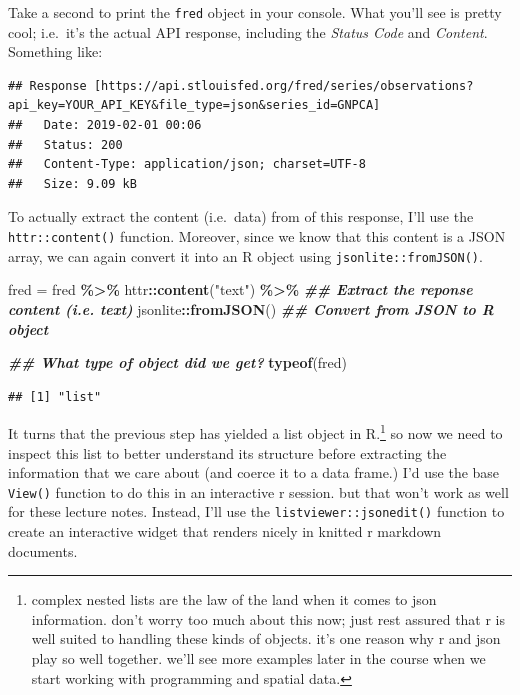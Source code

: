\documentclass[
]{article}
\newenvironment{Shaded}{\begin{snugshade}}{\end{snugshade}}
\newcommand{\DocumentationTok}[1]{\textcolor[rgb]{0.56,0.35,0.01}{\textbf{\textit{#1}}}}
\newcommand{\FunctionTok}[1]{\textcolor[rgb]{0.13,0.29,0.53}{\textbf{#1}}}
\newcommand{\NormalTok}[1]{#1}
\newcommand{\OtherTok}[1]{\textcolor[rgb]{0.56,0.35,0.01}{#1}}
\newcommand{\SpecialCharTok}[1]{\textcolor[rgb]{0.81,0.36,0.00}{\textbf{#1}}}
\newcommand{\StringTok}[1]{\textcolor[rgb]{0.31,0.60,0.02}{#1}}
\begin{document}
Take a second to print the \texttt{fred} object in your console. What
you'll see is pretty cool; i.e.~it's the actual API response, including
the \emph{Status Code} and \emph{Content}. Something like:

\begin{verbatim}
## Response [https://api.stlouisfed.org/fred/series/observations?api_key=YOUR_API_KEY&file_type=json&series_id=GNPCA]
##   Date: 2019-02-01 00:06
##   Status: 200
##   Content-Type: application/json; charset=UTF-8
##   Size: 9.09 kB
\end{verbatim}

To actually extract the content (i.e.~data) from of this response, I'll
use the \texttt{httr::content()} function. Moreover, since we know that
this content is a JSON array, we can again convert it into an R object
using \texttt{jsonlite::fromJSON()}.

\begin{Shaded}
\begin{Highlighting}[]
\NormalTok{fred }\OtherTok{=} 
\NormalTok{  fred }\SpecialCharTok{\%\textgreater{}\%} 
\NormalTok{  httr}\SpecialCharTok{::}\FunctionTok{content}\NormalTok{(}\StringTok{"text"}\NormalTok{) }\SpecialCharTok{\%\textgreater{}\%} \DocumentationTok{\#\# Extract the reponse content (i.e. text)}
\NormalTok{  jsonlite}\SpecialCharTok{::}\FunctionTok{fromJSON}\NormalTok{()      }\DocumentationTok{\#\# Convert from JSON to R object}

\DocumentationTok{\#\# What type of object did we get?}
\FunctionTok{typeof}\NormalTok{(fred)}
\end{Highlighting}
\end{Shaded}

\begin{verbatim}
## [1] "list"
\end{verbatim}

It turns that the previous step has yielded a list object in
R.\footnote{complex nested lists are the law of the land when it comes
  to json information. don't worry too much about this now; just rest
  assured that r is well suited to handling these kinds of objects. it's
  one reason why r and json play so well together. we'll see more
  examples later in the course when we start working with programming
  and spatial data.} so now we need to inspect this list to better
understand its structure before extracting the information that we care
about (and coerce it to a data frame.) I'd use the base \texttt{View()}
function to do this in an interactive r session. but that won't work as
well for these lecture notes. Instead, I'll use the
\texttt{listviewer::jsonedit()} function to create an interactive widget
that renders nicely in knitted r markdown documents.
\end{document}
